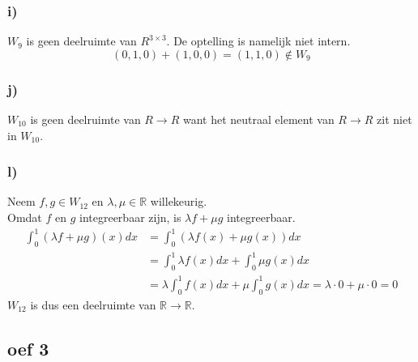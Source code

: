 \documentclass[lineaire_algebra_oplossingen.tex]{subfiles}
\begin{document}
\subsubsection*{i)}
$W_9$ is geen deelruimte van $R^{3\times 3}$. De optelling is namelijk niet intern.
\[
(0,1,0) + (1,0,0) = (1,1,0) \not \in W_9
\]

\subsubsection*{j)}
$W_{10}$ is geen deelruimte van $R\rightarrow R$ want het neutraal element van $R\rightarrow R$  zit niet in $W_{10}$.
\subsubsection*{l)}
Neem $f, g \in W_{12}$ en $\lambda, \mu \in \mathbb{R}$ willekeurig.\\
Omdat $f$ en $g$ integreerbaar zijn, is $\lambda f + \mu g$ integreerbaar.
\begin{align*}
  \int^1_0 (\lambda f + \mu g)(x)dx &= \int^1_0(\lambda f(x) + \mu g(x))dx\\
  &= \int^1_0 \lambda f(x)dx + \int^1_0 \mu g(x)dx\\
  &= \lambda \int^1_0 f(x)dx + \mu \int^1_0 g(x)dx = \lambda \cdot 0 + \mu \cdot 0 = 0
\end{align*}
$W_{12}$ is dus een deelruimte van $\mathbb{R} \rightarrow \mathbb{R}$.



\subsection*{oef 3}
\end{document}
